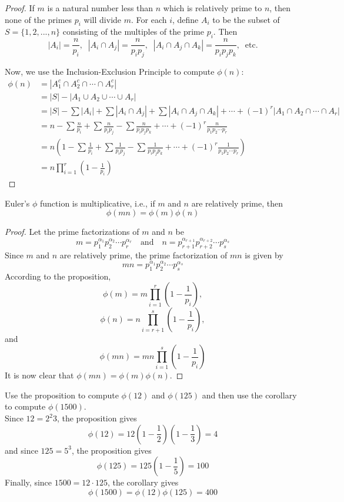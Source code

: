 \documentclass[handout]{ximera}
\begin{document}
\begin{proof}
If $m$ is a natural number less than $n$ which is relatively prime to $n$, 
then none of the primes $p_i$ will divide $m$.
For each $i$, define 
$A_i$ to be the subset of $S = \{1, 2, ..., n\}$ consisting of the multiples of the prime $p_i$.
Then
\[
|A_i| = \frac{n}{p_i}, \;\;|A_i \cap A_j| = \frac{n}{p_i p_j}, \;\;|A_i \cap A_j \cap A_k| = \frac{n}{p_i p_jp_k}, \;\;\text{etc.}
\]

Now, we use the Inclusion-Exclusion Principle to compute $\phi(n)$:
\begin{align*}
\phi(n) &= |A_1^c \cap A_2^c \cap \cdots \cap A_r^c|\\
&= |S| -  |A_1 \cup A_2 \cup \cdots \cup A_r|\\
&= |S| - \sum|A_i| + \sum|A_i \cap A_j| + \sum|A_i \cap A_j \cap A_k| + \cdots + (-1)^r|A_1 \cap A_2 \cap \cdots \cap A_r|\\[7pt]
&= n - \sum \frac{n}{p_i} + \sum \frac{n}{p_ip_j} - \sum \frac{n}{p_ip_jp_k} + \cdots + (-1)^r \frac{n}{p_1p_2 \cdots p_r}\\[7pt]
&= n\left(1 - \sum \frac{1}{p_i} + \sum \frac{1}{p_ip_j} - \sum \frac{1}{p_ip_jp_k} + \cdots + (-1)^r \frac{1}{p_1p_2 \cdots p_r} \right)\\[7pt]
&= n \prod_{i = 1}^r \left(1 - \frac{1}{p_i}\right)
\end{align*}
\end{proof}

\begin{corollary}
Euler's $\phi$ function is multiplicative, i.e., if $m$ and $n$ are relatively prime, then
\[
\phi(mn) = \phi(m)\phi(n)
\]
\end{corollary}
\begin{proof}
Let the prime factorizations of $m$ and $n$ be
\[
m = p_1^{\alpha_1} p_2^{\alpha_2}\cdots p_r^{\alpha_r} \quad \text{and} \quad n = p_{r+1}^{\alpha_{r+1}} p_{r+2}^{\alpha_{r+2}}\cdots p_s^{\alpha_s}
\]
Since $m$ and $n$ are relatively prime, the prime factorization of $mn$ is given by
\[
mn = p_1^{\alpha_1} p_2^{\alpha_2}\cdots p_s^{\alpha_s}
\]
According to the proposition,
\[
\phi(m) = m \prod_{i = 1}^r \left(1 - \frac{1}{p_i}\right),
\]
\[
\phi(n) = n \prod_{i = r+1}^s \left(1 - \frac{1}{p_i}\right),
\]
and
\[
\phi(mn) = mn \prod_{i = 1}^s \left(1 - \frac{1}{p_i}\right)
\]
It is now clear that $\phi(mn) = \phi(m) \phi(n)$.
\end{proof}

\begin{example}[example 4]
Use the proposition to compute $\phi(12)$ and $\phi(125)$ and then use the corollary to compute $\phi(1500)$.\\
Since $12 = 2^2 3$, the proposition gives
\[
\phi(12) = 12\left(1-\frac12\right)\left(1-\frac13\right) = 4
\]
and since $125 = 5^3$, the proposition gives
\[
\phi(125) = 125\left(1-\frac15\right) = 100
\]
Finally, since $1500 = 12 \cdot 125$, the corollary gives
\[
\phi(1500) = \phi(12)\phi(125) = 400
\]
\end{example}
\end{document}
